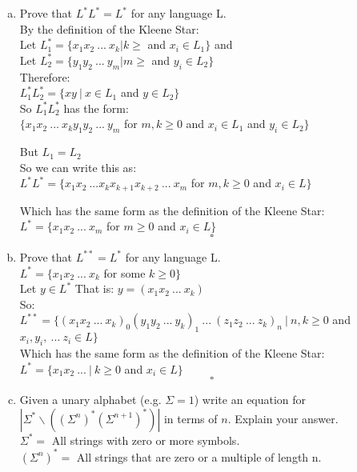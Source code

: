 \documentclass{article}
\begin{document}
\begin{enumerate}[a)]
    \item Prove that $L^*L^*=L^*$ for any language L.\\
    By the definition of the Kleene Star:\\
    Let $L_1^* = \{x_1x_2\ ...\ x_k | k \geq $ and $ x_i \in L_1 \}$ and \\
    Let $L_2^* = \{y_1y_2\ ...\ y_m | m \geq $ and $ y_i \in L_2 \}$ \\[5pt]
    Therefore: \\
    $L_1^*L_2^* = \{ xy\ |\ x \in L_1 $ and $ y \in L_2 \}$ \\
    So $L_1^*L_2^*$ has the form: \\
    $\{x_1x_2 \ ...\ x_ky_1y_2\ ...\ y_m $ for $m,k \geq 0$ and $x_i \in L_1$ and $y_i \in L_2\}$

    But $L_1 = L_2$ \\
    So we can write this as: \\
    $L^*L^* = \{x_1x_2\ ... x_kx_{k+1}x_{k+2}\ ...\ x_m$ for $m,k \geq 0 $ and $ x_i \in L \}$

    Which has the same form as the definition of the Kleene Star:\\
    $L^* = \{x_1x_2\ ...\ x_m$ for $ m \geq 0 $ and $ x_i \in L\}$\\
    \[ \square\]

    \item Prove that $L^{**}=L^*$ for any language L.\\
    $L^* = \{ x_1x_2\ ...\ x_k$ for some $ k \geq 0 \}$\\
    Let $y \in L^*$ That is: $y = (x_1x_2\ ...\ x_k)$\\
    So: \\
    $L^{**} = \{(x_1x_2\ ...\ x_k)_0(y_1y_2\ ...\ y_k)_1 \ ...\ (z_1z_2\ ...\ z_k)_n\ |\ 
    n,k \geq 0 $ and $ x_i,y_i,\ ...\ z_i \in L \}$\\
    Which has the same form as the definition of the Kleene Star: \\
    $L^* = \{x_1x_2\ ...\ |\ k \geq 0$ and $ x_i \in L\}$
    \[ \square \]
    \item Given a unary alphabet (e.g. $\Sigma = {1}$) write an equation for
    $|\Sigma^* \backslash ((\Sigma^n)^*(\Sigma^{n+1})^*)|$ in terms of $n$. Explain your answer.\\
    $\Sigma^*=$ All strings with zero or more symbols.\\
    $(\Sigma^n)^* =$ All strings that are zero or a multiple of length n. \\[5pt]


\end{enumerate}
\end{document}
